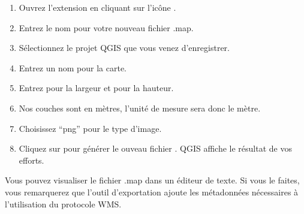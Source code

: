 
\begin{enumerate}
  \item Ouvrez l'extension en cliquant sur l'icône .
  \item Entrez le nom  pour votre nouveau fichier .map.
  \item Sélectionnez le projet QGIS  que vous venez d'enregistrer.
  \item Entrez un nom  pour la carte.
  \item Entrez  pour la largeur et  pour la hauteur.
  \item Nos couches sont en mètres, l'unité de mesure sera donc le mètre.
  \item Choisissez ``png'' pour le type d'image.
  \item Cliquez sur  pour générer le ouveau fichier . 
  QGIS affiche le résultat de vos efforts.
\end{enumerate}


Vous pouvez visualiser le fichier .map dans un éditeur de texte. Si vous le faites, vous remarquerez que l'outil d'exportation ajoute les métadonnées nécessaires à l'utilisation du protocole WMS.

